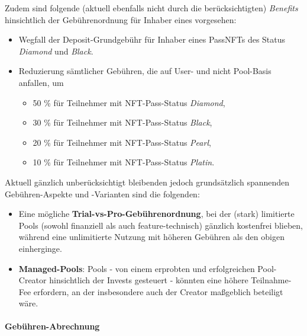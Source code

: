 \begin{Assumption}[Gebühren]
Zudem sind folgende (aktuell ebenfalls nicht durch die  berück\-sichtigten) \textit{Benefits} hinsichtlich der Gebührenordnung für Inhaber eines  vorgesehen:

\begin{itemize}
	\item Wegfall der Deposit-Grundgebühr für Inhaber eines PassNFTs des Status \\ \textit{Diamond} und \textit{Black}.
	\item Reduzierung sämtlicher Gebühren, die auf User- und nicht Pool-Basis anfallen, um
	\begin{itemize}
		\item 50 \% für Teilnehmer mit NFT-Pass-Status \textit{Diamond},
		\item 30 \% für Teilnehmer mit NFT-Pass-Status \textit{Black},
		\item 20 \% für Teilnehmer mit NFT-Pass-Status \textit{Pearl},
		\item 10 \% für Teilnehmer mit NFT-Pass-Status \textit{Platin}.
	\end{itemize}
\end{itemize}

\vspace{0.5cm}	

Aktuell gänzlich unberücksichtigt bleibenden jedoch grundsätzlich spannenden Gebühren-Aspekte und -Varianten sind die folgenden:

\begin{itemize}
	\item Eine mögliche \textbf{Trial-vs-Pro-Gebührenordnung}, bei der (stark) limitierte Pools (sowohl finanziell als auch feature-technisch) gänzlich kostenfrei blieben, während eine unlimitierte Nutzung mit höheren Gebühren als den obigen einherginge.
	\item \textbf{Managed-Pools}: Pools - von einem erprobten und erfolgreichen Pool-Creator hinsichtlich der Invests gesteuert - könnten eine höhere Teilnahme-Fee erfordern, an der insbesondere auch der Creator maßgeblich beteiligt wäre. 
\end{itemize}	

\end{Assumption}

\vspace{0.5cm}



\paragraph{Gebühren-Abrechnung}
\label{fees-charging}
\textbf{ }
\vspace{0.2cm}

